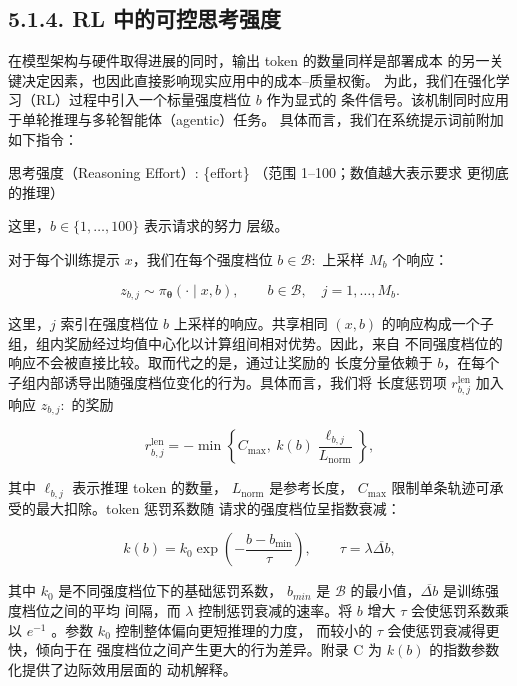 \subsection{5.1.4. RL 中的可控思考强度}\label{controllable-reasoning-effort-in-rl}

在模型架构与硬件取得进展的同时，输出 token 的数量同样是部署成本
的另一关键决定因素，也因此直接影响现实应用中的成本--质量权衡。
为此，我们在强化学习（RL）过程中引入一个标量强度档位 $b$ 作为显式的
条件信号。该机制同时应用于单轮推理与多轮智能体（agentic）任务。
具体而言，我们在系统提示词前附加如下指令：

思考强度（Reasoning Effort）: \{effort\} （范围 1--100；数值越大表示要求
更彻底的推理）

这里，\(b \in \{ 1 , \dots , 1 0 0 \}\) 表示请求的努力
层级。

对于每个训练提示 $x$，我们在每个强度档位 \(b \in { \mathcal { B } } :\) 上采样 \(M _ { b }\) 个响应：

\[
z _ { b , j } \sim \pi _ { \boldsymbol { \theta } } ( \cdot \mid x , b ) , \qquad b \in \mathcal { B } , \quad j = 1 , \ldots , M _ { b } .\tag{8}
\]

这里，$j$ 索引在强度档位 $b$ 上采样的响应。共享相同 \(( x , b )\) 的响应构成一个子组，组内奖励经过均值中心化以计算组间相对优势。因此，来自
不同强度档位的响应不会被直接比较。取而代之的是，通过让奖励的
长度分量依赖于 $b$，在每个子组内部诱导出随强度档位变化的行为。具体而言，我们将
长度惩罚项 \(r _ { b , j } ^ { \mathrm { l e n } }\) 加入
响应 \(z _ { b , j } \mathrm { : }\) 的奖励

\[
r _ { b , j } ^ { \mathrm { l e n } } = - \operatorname* { m i n } \left\{ C _ { \mathrm { m a x } } , \ k ( b ) \frac { \ell _ { b , j } } { L _ { \mathrm { n o r m } } } \right\} ,\tag{9}
\]

其中 \(\ell _ { b , j }\) 表示推理 token 的数量，
\(L _ { \mathrm { n o r m } }\) 是参考长度，
\(C _ { \mathrm { m a x } }\) 限制单条轨迹可承受的最大扣除。token 惩罚系数随
请求的强度档位呈指数衰减：

\[
k ( b ) = k _ { 0 } \exp \left( - \frac { b - b _ { \mathrm { m i n } } } { \tau } \right) , \qquad \tau = \lambda \overline { { \Delta b } } ,\tag{10}
\]

其中 \(k _ { 0 }\) 是不同强度档位下的基础惩罚系数，
\(b _ { m i n }\) 是 $\mathcal{B}$ 的最小值，$\overline { { \Delta b } }$ 是训练强度档位之间的平均
间隔，而 $\lambda$ 控制惩罚衰减的速率。将 $b$ 增大 $\tau$ 会使惩罚系数乘以
\(e ^ { - 1 }\) 。参数 \(k _ { 0 }\) 控制整体偏向更短推理的力度，
而较小的 $\tau$ 会使惩罚衰减得更快，倾向于在
强度档位之间产生更大的行为差异。附录 C 为 $k(b)$ 的指数参数化提供了边际效用层面的
动机解释。



